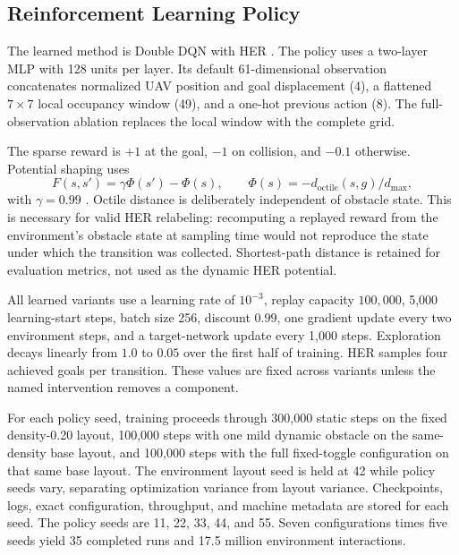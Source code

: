 \subsection{Reinforcement Learning Policy}
\label{sec:rl-policy}

The learned method is Double DQN \cite{vanhasselt2016double} with HER
\cite{andrychowicz2017her}. The policy uses a two-layer MLP with 128 units per
layer. Its default 61-dimensional observation concatenates normalized UAV
position and goal displacement (4), a flattened $7\times7$ local occupancy
window (49), and a one-hot previous action (8). The full-observation ablation
replaces the local window with the complete grid.

The sparse reward is $+1$ at the goal, $-1$ on collision, and $-0.1$ otherwise.
Potential shaping uses
\begin{equation}
F(s,s')=\gamma\Phi(s')-\Phi(s), \qquad
\Phi(s)=-d_{\mathrm{octile}}(s,g)/d_{\max},
\end{equation}
with $\gamma=0.99$ \cite{ng1999shaping}. Octile distance is deliberately
independent of obstacle state. This is necessary for valid HER relabeling:
recomputing a replayed reward from the environment's obstacle state at sampling
time would not reproduce the state under which the transition was collected.
Shortest-path distance is retained for evaluation metrics, not used as the
dynamic HER potential.

All learned variants use a learning rate of $10^{-3}$, replay capacity
$100{,}000$, 5,000 learning-start steps, batch size 256, discount $0.99$, one
gradient update every two environment steps, and a target-network update every
1,000 steps. Exploration decays linearly from $1.0$ to $0.05$ over the first
half of training. HER samples four achieved goals per transition. These values
are fixed across variants unless the named intervention removes a component.

For each policy seed, training proceeds through 300,000 static steps on the
fixed density-0.20 layout, 100,000 steps with one mild dynamic obstacle on the
same-density base layout, and 100,000 steps with the full fixed-toggle
configuration on that same base layout. The environment layout
seed is held at 42 while policy seeds vary, separating optimization variance
from layout variance. Checkpoints, logs, exact configuration, throughput, and
machine metadata are stored for each seed. The policy seeds are 11, 22, 33,
44, and 55. Seven configurations times five seeds yield 35 completed runs and
17.5 million environment interactions.

